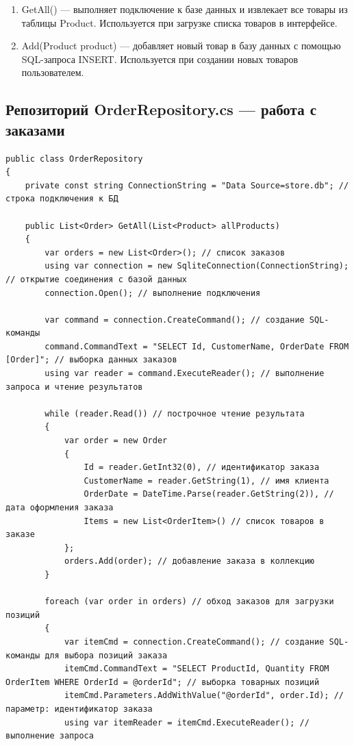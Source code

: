 \documentclass[12pt]{article}
\renewcommand{\texttt}[1]{{\small\ttfamily #1}}
\newenvironment{code}{\captionsetup{type=listing}}{}
\numberwithin{listing}{section}
\numberwithin{figure}{section}
\begin{document}
\begin{enumerate}
	\item \texttt{GetAll()} — выполняет подключение к базе данных и извлекает все товары из таблицы \texttt{Product}. Используется при загрузке списка товаров в интерфейсе.
	\item \texttt{Add(Product product)} — добавляет новый товар в базу данных с помощью SQL-запроса \texttt{INSERT}. Используется при создании новых товаров пользователем.
\end{enumerate}

\subsection{Репозиторий \texttt{OrderRepository.cs} — работа с заказами}
\begin{code}
	\begin{verbatim}
public class OrderRepository
{
    private const string ConnectionString = "Data Source=store.db"; // строка подключения к БД

    public List<Order> GetAll(List<Product> allProducts)
    {
        var orders = new List<Order>(); // список заказов
        using var connection = new SqliteConnection(ConnectionString); // открытие соединения с базой данных
        connection.Open(); // выполнение подключения

        var command = connection.CreateCommand(); // создание SQL-команды
        command.CommandText = "SELECT Id, CustomerName, OrderDate FROM [Order]"; // выборка данных заказов
        using var reader = command.ExecuteReader(); // выполнение запроса и чтение результатов

        while (reader.Read()) // построчное чтение результата
        {
            var order = new Order
            {
                Id = reader.GetInt32(0), // идентификатор заказа
                CustomerName = reader.GetString(1), // имя клиента
                OrderDate = DateTime.Parse(reader.GetString(2)), // дата оформления заказа
                Items = new List<OrderItem>() // список товаров в заказе
            };
            orders.Add(order); // добавление заказа в коллекцию
        }

        foreach (var order in orders) // обход заказов для загрузки позиций
        {
            var itemCmd = connection.CreateCommand(); // создание SQL-команды для выбора позиций заказа
            itemCmd.CommandText = "SELECT ProductId, Quantity FROM OrderItem WHERE OrderId = @orderId"; // выборка товарных позиций
            itemCmd.Parameters.AddWithValue("@orderId", order.Id); // параметр: идентификатор заказа
            using var itemReader = itemCmd.ExecuteReader(); // выполнение запроса


\end{verbatim}
\end{code}
\end{document}

